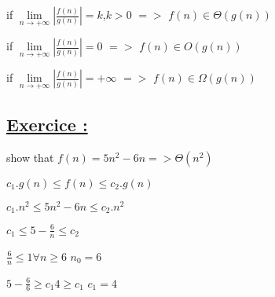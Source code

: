 \vspace{0.75cm}
\begin{tcolorbox}[enhanced, colback=white!90!greenPlot, colframe=greenPlot!60!black, coltitle=white, fonttitle=\bfseries\Large, title=Laudau Notation Limit Definition, boxrule=1mm, arc=0.5mm, drop shadow=greenPlot!35!gray]
    if \quad\(\lim\limits_{n \to +\infty}\left| \frac{f(n)}{g(n)}\right| =\)\hspace{0.15cm}\(k\)\quad,\quad\( k > \)0  \quad \(=> \) \quad \(f(n) \in \Theta (g(n))\)

    \vspace{0.25cm}
    if \quad\(\lim\limits_{n \to +\infty}\left| \frac{f(n)}{g(n)}\right| =\)\hspace{0.15cm}\(0\) \hspace{1.45cm} \quad \(=> \) \quad \(f(n) \in O (g(n))\)
    
    \vspace{0.25cm}
    if \quad\(\lim\limits_{n \to +\infty}\left| \frac{f(n)}{g(n)}\right| =\)\hspace{0.15cm}\(+\infty\) \hspace{1cm} \quad \(=> \) \quad \(f(n) \in \Omega (g(n))\)
\end{tcolorbox}


\subsection*{\underline{Exercice :}} show that
\(f(n) = 5n^2 - 6n => \Theta(n^2)\)
 
\vspace{0.5cm} 
\hspace{8.25cm}\( c_1.g(n) \leq f(n) \leq c_2.g(n)\)

\vspace{0.15cm}
\hspace{8.5cm}\( c_1.n^2 \leq 5n^2-6n \leq c_2.n^2\)

\vspace{0.15cm}
\hspace{8.85cm}\( c_1 \leq 5 - \frac{6}{n} \leq c_2\) 

\vspace{0.15cm}
\hspace{7.75cm}\(\frac{6}{n} \leq 1\)\quad \quad \(\forall n \geq 6\) \quad \(\boxed{n_0 = 6}\)

\vspace{0.15cm}
\hspace{7.75cm}\(5 - \frac {6}{6} \geq c_1\)\quad \(4 \geq c_1\)\hspace{0.35cm} \(\boxed{c_1 = 4}\)

